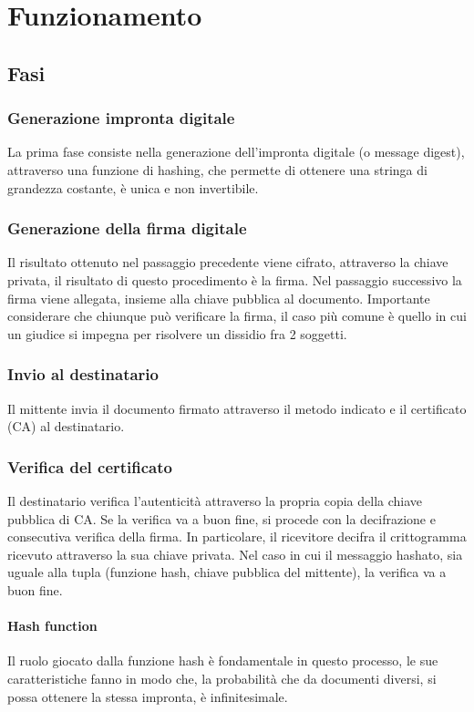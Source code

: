 \chapter{Funzionamento}

\section{Fasi}

\subsection{Generazione impronta digitale}

La prima fase consiste nella generazione dell'impronta digitale (o message digest), attraverso una funzione di hashing, che permette di ottenere una stringa di grandezza costante, è unica e non invertibile. 

\subsection{Generazione della firma digitale}
Il risultato ottenuto nel passaggio precedente viene cifrato, attraverso la chiave privata, il risultato di questo procedimento è la firma. Nel passaggio successivo la firma viene allegata, insieme alla chiave pubblica al documento. Importante considerare che chiunque può verificare la firma, il caso più comune è quello in cui un giudice si impegna per risolvere un dissidio fra 2 soggetti.

\subsection{Invio al destinatario}

Il mittente invia il documento firmato attraverso il metodo indicato e il certificato (CA) al destinatario.

\subsection{Verifica del certificato}

Il destinatario verifica l'autenticità attraverso la propria copia della chiave pubblica di CA. Se la verifica va a buon fine, si procede con la decifrazione e consecutiva verifica della firma. In particolare, il ricevitore decifra il crittogramma ricevuto attraverso la sua chiave privata. Nel caso in cui il messaggio hashato, sia uguale alla tupla (funzione hash, chiave pubblica del mittente), la verifica va a buon fine.

\subsubsection{Hash function}

Il ruolo giocato dalla funzione hash è fondamentale in questo processo, le sue caratteristiche fanno in modo che, la probabilità che da documenti diversi, si possa ottenere la stessa impronta, è infinitesimale.
